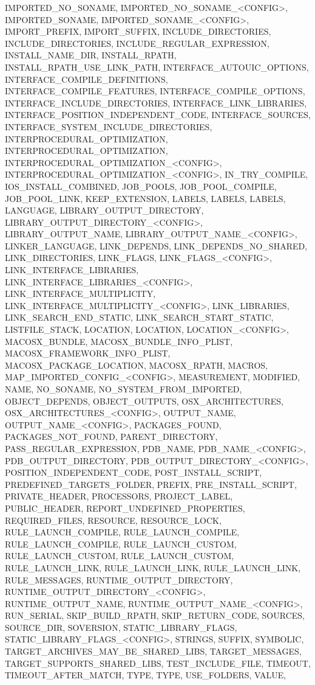 {{IMPORTED_NO_SONAME,
IMPORTED_NO_SONAME_<CONFIG>,
IMPORTED_SONAME,
IMPORTED_SONAME_<CONFIG>,
IMPORT_PREFIX,
IMPORT_SUFFIX,
INCLUDE_DIRECTORIES,
INCLUDE_DIRECTORIES,
INCLUDE_REGULAR_EXPRESSION,
INSTALL_NAME_DIR,
INSTALL_RPATH,
INSTALL_RPATH_USE_LINK_PATH,
INTERFACE_AUTOUIC_OPTIONS,
INTERFACE_COMPILE_DEFINITIONS,
INTERFACE_COMPILE_FEATURES,
INTERFACE_COMPILE_OPTIONS,
INTERFACE_INCLUDE_DIRECTORIES,
INTERFACE_LINK_LIBRARIES,
INTERFACE_POSITION_INDEPENDENT_CODE,
INTERFACE_SOURCES,
INTERFACE_SYSTEM_INCLUDE_DIRECTORIES,
INTERPROCEDURAL_OPTIMIZATION,
INTERPROCEDURAL_OPTIMIZATION,
INTERPROCEDURAL_OPTIMIZATION_<CONFIG>,
INTERPROCEDURAL_OPTIMIZATION_<CONFIG>,
IN_TRY_COMPILE,
IOS_INSTALL_COMBINED,
JOB_POOLS,
JOB_POOL_COMPILE,
JOB_POOL_LINK,
KEEP_EXTENSION,
LABELS,
LABELS,
LABELS,
LANGUAGE,
LIBRARY_OUTPUT_DIRECTORY,
LIBRARY_OUTPUT_DIRECTORY_<CONFIG>,
LIBRARY_OUTPUT_NAME,
LIBRARY_OUTPUT_NAME_<CONFIG>,
LINKER_LANGUAGE,
LINK_DEPENDS,
LINK_DEPENDS_NO_SHARED,
LINK_DIRECTORIES,
LINK_FLAGS,
LINK_FLAGS_<CONFIG>,
LINK_INTERFACE_LIBRARIES,
LINK_INTERFACE_LIBRARIES_<CONFIG>,
LINK_INTERFACE_MULTIPLICITY,
LINK_INTERFACE_MULTIPLICITY_<CONFIG>,
LINK_LIBRARIES,
LINK_SEARCH_END_STATIC,
LINK_SEARCH_START_STATIC,
LISTFILE_STACK,
LOCATION,
LOCATION,
LOCATION_<CONFIG>,
MACOSX_BUNDLE,
MACOSX_BUNDLE_INFO_PLIST,
MACOSX_FRAMEWORK_INFO_PLIST,
MACOSX_PACKAGE_LOCATION,
MACOSX_RPATH,
MACROS,
MAP_IMPORTED_CONFIG_<CONFIG>,
MEASUREMENT,
MODIFIED,
NAME,
NO_SONAME,
NO_SYSTEM_FROM_IMPORTED,
OBJECT_DEPENDS,
OBJECT_OUTPUTS,
OSX_ARCHITECTURES,
OSX_ARCHITECTURES_<CONFIG>,
OUTPUT_NAME,
OUTPUT_NAME_<CONFIG>,
PACKAGES_FOUND,
PACKAGES_NOT_FOUND,
PARENT_DIRECTORY,
PASS_REGULAR_EXPRESSION,
PDB_NAME,
PDB_NAME_<CONFIG>,
PDB_OUTPUT_DIRECTORY,
PDB_OUTPUT_DIRECTORY_<CONFIG>,
POSITION_INDEPENDENT_CODE,
POST_INSTALL_SCRIPT,
PREDEFINED_TARGETS_FOLDER,
PREFIX,
PRE_INSTALL_SCRIPT,
PRIVATE_HEADER,
PROCESSORS,
PROJECT_LABEL,
PUBLIC_HEADER,
REPORT_UNDEFINED_PROPERTIES,
REQUIRED_FILES,
RESOURCE,
RESOURCE_LOCK,
RULE_LAUNCH_COMPILE,
RULE_LAUNCH_COMPILE,
RULE_LAUNCH_COMPILE,
RULE_LAUNCH_CUSTOM,
RULE_LAUNCH_CUSTOM,
RULE_LAUNCH_CUSTOM,
RULE_LAUNCH_LINK,
RULE_LAUNCH_LINK,
RULE_LAUNCH_LINK,
RULE_MESSAGES,
RUNTIME_OUTPUT_DIRECTORY,
RUNTIME_OUTPUT_DIRECTORY_<CONFIG>,
RUNTIME_OUTPUT_NAME,
RUNTIME_OUTPUT_NAME_<CONFIG>,
RUN_SERIAL,
SKIP_BUILD_RPATH,
SKIP_RETURN_CODE,
SOURCES,
SOURCE_DIR,
SOVERSION,
STATIC_LIBRARY_FLAGS,
STATIC_LIBRARY_FLAGS_<CONFIG>,
STRINGS,
SUFFIX,
SYMBOLIC,
TARGET_ARCHIVES_MAY_BE_SHARED_LIBS,
TARGET_MESSAGES,
TARGET_SUPPORTS_SHARED_LIBS,
TEST_INCLUDE_FILE,
TIMEOUT,
TIMEOUT_AFTER_MATCH,
TYPE,
TYPE,
USE_FOLDERS,
VALUE,
}}
